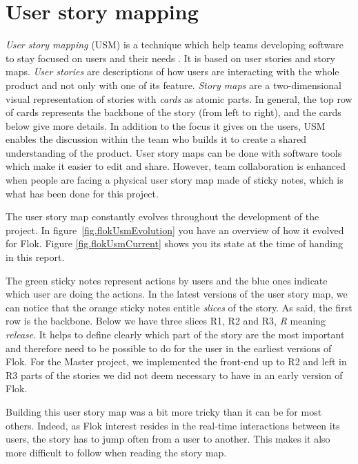 \documentclass[a4paper,12pt,twoside]{article}
\begin{document}
\section{User story mapping}
\emph{User story mapping} (USM) is a technique which help teams developing software to stay focused on users and their needs \cite{patton2014user}.
It is based on user stories and story maps. \emph{User stories} are descriptions of how users are interacting with the whole product and not only with one of its feature.
\emph{Story maps} are a two-dimensional visual representation of stories with \emph{cards} as atomic parts.
In general, the top row of cards represents the backbone of the story (from left to right), and the cards below give more details.
In addition to the focus it gives on the users, USM enables the discussion within the team who builds it to create a shared understanding of the product.
User story maps can be done with software tools which make it easier to edit and share.
However, team collaboration is enhanced when people are facing a physical user story map made of sticky notes, which is what has been done for this project.

The user story map constantly evolves throughout the development of the project.
In figure~\ref{fig.flokUsmEvolution} you have an overview of how it evolved for Flok.
Figure \ref{fig.flokUsmCurrent} shows you its state at the time of handing in this report.

The green sticky notes represent actions by users and the blue ones indicate which user are doing the actions.
In the latest versions of the user story map, we can notice that the orange sticky notes entitle \emph{slices} of the story.
As said, the first row is the backbone.
Below we have three slices R1, R2 and R3, \emph{R} meaning \emph{release}.
It helps to define clearly which part of the story are the most important and therefore need to be possible to do for the user in the earliest versions of Flok.
For the Master project, we implemented the front-end up to R2 and left in R3 parts of the stories we did not deem necessary to have in an early version of Flok.

Building this user story map was a bit more tricky than it can be for most others.
Indeed, as Flok interest resides in the real-time interactions between its users, the story has to jump often from a user to another.
This makes it also more difficult to follow when reading the story map.
\end{document}
